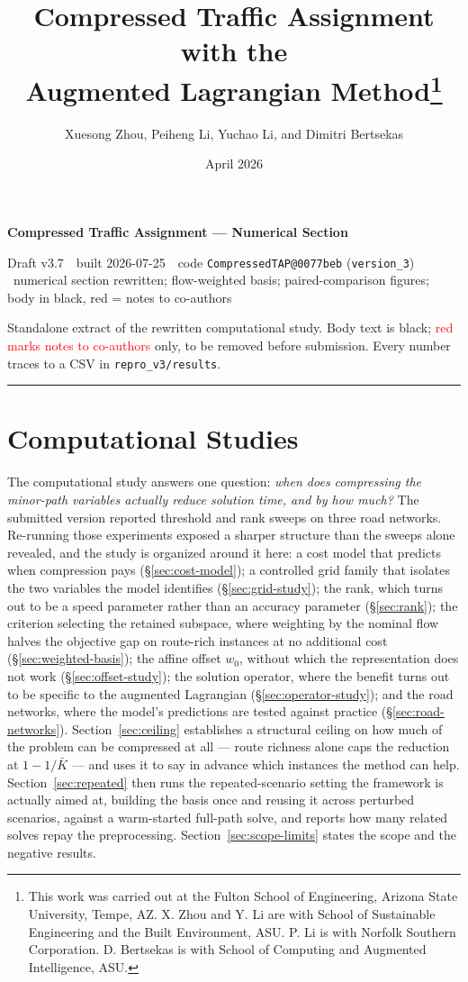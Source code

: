 \documentclass[11pt]{article}
\title{Compressed Traffic Assignment with the \\Augmented Lagrangian Method\footnote{
This work was carried out at the Fulton School of Engineering, Arizona State University, Tempe, AZ. X. Zhou and Y. Li are with School of Sustainable Engineering and the Built Environment, ASU. P. Li is with Norfolk Southern Corporation. D. Bertsekas is with School of Computing and Augmented Intelligence, ASU.}}
\author{Xuesong Zhou, Peiheng Li, Yuchao Li, and Dimitri Bertsekas}
\date{April 2026}
\makeatletter
\newcommand{\docver}{v3.7}
\newcommand{\docdate}{2026-07-25}
\newcommand{\doccommit}{0077beb}
\newcommand{\docstamp}{Draft \docver\ \textbullet\ built \docdate\ \textbullet\ code
  \texttt{CompressedTAP@\doccommit} (\texttt{version\_3}) \textbullet\ numerical section
  rewritten; flow-weighted basis; paired-comparison figures; body in black, red = notes to co-authors}
\makeatother
\begin{document}
{\Large\bfseries Compressed Traffic Assignment --- Numerical Section}\par
\vspace{3pt}
{\small\textsf{\docstamp}}\par
\vspace{3pt}
{\small Standalone extract of the rewritten computational study. Body text is black;
\textcolor{red}{red marks notes to co-authors} only, to be removed before submission.
Every number traces to a CSV in \texttt{repro\_v3/results}.}
\vspace{8pt}\hrule\vspace{8pt}
\section{Computational Studies}
\label{sec:experiments}
\label{sec:experiments}\label{sec:computational}


The computational study answers one question: \emph{when does compressing the minor-path
variables actually reduce solution time, and by how much?} The submitted version reported
threshold and rank sweeps on three road networks. Re-running those experiments exposed a
sharper structure than the sweeps alone revealed, and the study is organized around it here:
a cost model that predicts when compression pays (\S\ref{sec:cost-model}); a controlled grid
family that isolates the two variables the model identifies (\S\ref{sec:grid-study}); the
rank, which turns out to be a speed parameter rather than an accuracy parameter
(\S\ref{sec:rank}); the criterion selecting the retained subspace, where weighting by the
nominal flow halves the objective gap on route-rich instances at no additional cost
(\S\ref{sec:weighted-basis}); the affine offset $w_0$, without which the representation does not work
(\S\ref{sec:offset-study}); the solution operator, where the benefit turns out to be specific
to the augmented Lagrangian (\S\ref{sec:operator-study}); and the road networks, where the
model's predictions are tested against practice (\S\ref{sec:road-networks}).
Section~\ref{sec:ceiling} establishes a structural ceiling on how much of the problem can be
compressed at all --- route richness alone caps the reduction at $1-1/\bar K$ --- and uses it
to say in advance which instances the method can help.
Section~\ref{sec:repeated} then runs the repeated-scenario setting the framework is actually
aimed at, building the basis once and reusing it across perturbed scenarios, against a
warm-started full-path solve, and reports how many related solves repay the preprocessing.
Section~\ref{sec:scope-limits} states the scope and the negative results.
\end{document}
